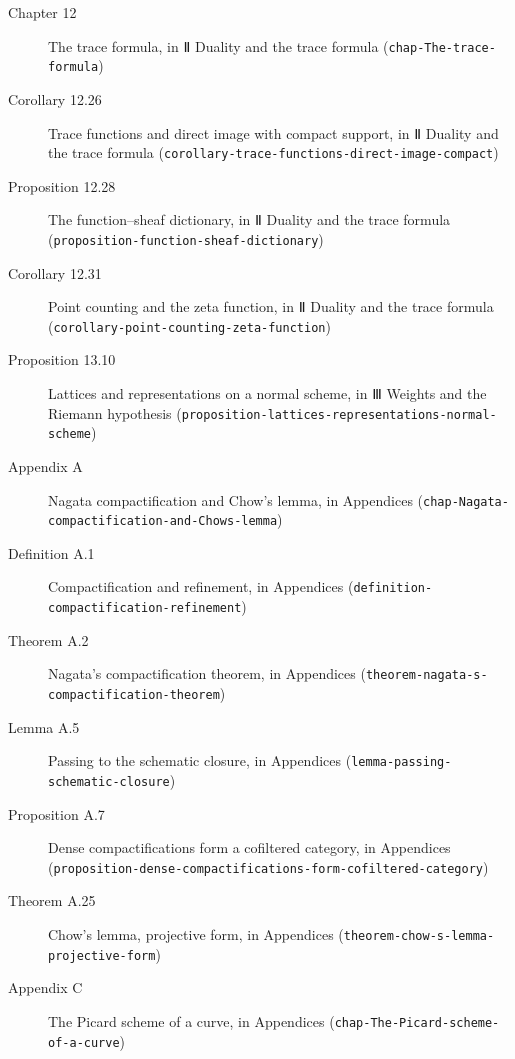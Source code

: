 \documentclass[11pt]{article}
\newcommand{\bpslug}[1]{\texttt{#1}}
\begin{document}
\begin{description}
\item[Chapter 12] The trace formula, in Ⅱ Duality and the trace formula (\bpslug{chap-{}\allowbreak{}The-{}\allowbreak{}trace-{}\allowbreak{}formula})
\item[Corollary 12.26] Trace functions and direct image with compact support, in Ⅱ Duality and the trace formula (\bpslug{corollary-{}\allowbreak{}trace-{}\allowbreak{}functions-{}\allowbreak{}direct-{}\allowbreak{}image-{}\allowbreak{}compact})
\item[Proposition 12.28] The function–sheaf dictionary, in Ⅱ Duality and the trace formula (\bpslug{proposition-{}\allowbreak{}function-{}\allowbreak{}sheaf-{}\allowbreak{}dictionary})
\item[Corollary 12.31] Point counting and the zeta function, in Ⅱ Duality and the trace formula (\bpslug{corollary-{}\allowbreak{}point-{}\allowbreak{}counting-{}\allowbreak{}zeta-{}\allowbreak{}function})
\item[Proposition 13.10] Lattices and representations on a normal scheme, in Ⅲ Weights and the Riemann hypothesis (\bpslug{proposition-{}\allowbreak{}lattices-{}\allowbreak{}representations-{}\allowbreak{}normal-{}\allowbreak{}scheme})
\item[Appendix A] Nagata compactification and Chow's lemma, in Appendices (\bpslug{chap-{}\allowbreak{}Nagata-{}\allowbreak{}compactification-{}\allowbreak{}and-{}\allowbreak{}Chows-{}\allowbreak{}lemma})
\item[Definition A.1] Compactification and refinement, in Appendices (\bpslug{definition-{}\allowbreak{}compactification-{}\allowbreak{}refinement})
\item[Theorem A.2] Nagata's compactification theorem, in Appendices (\bpslug{theorem-{}\allowbreak{}nagata-{}\allowbreak{}s-{}\allowbreak{}compactification-{}\allowbreak{}theorem})
\item[Lemma A.5] Passing to the schematic closure, in Appendices (\bpslug{lemma-{}\allowbreak{}passing-{}\allowbreak{}schematic-{}\allowbreak{}closure})
\item[Proposition A.7] Dense compactifications form a cofiltered category, in Appendices (\bpslug{proposition-{}\allowbreak{}dense-{}\allowbreak{}compactifications-{}\allowbreak{}form-{}\allowbreak{}cofiltered-{}\allowbreak{}category})
\item[Theorem A.25] Chow's lemma, projective form, in Appendices (\bpslug{theorem-{}\allowbreak{}chow-{}\allowbreak{}s-{}\allowbreak{}lemma-{}\allowbreak{}projective-{}\allowbreak{}form})
\item[Appendix C] The Picard scheme of a curve, in Appendices (\bpslug{chap-{}\allowbreak{}The-{}\allowbreak{}Picard-{}\allowbreak{}scheme-{}\allowbreak{}of-{}\allowbreak{}a-{}\allowbreak{}curve})

\end{description}
\end{document}
